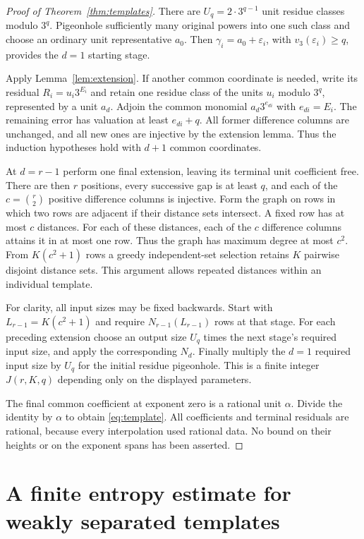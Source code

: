 \documentclass[11pt]{article}
\theoremstyle{definition}
\theoremstyle{remark}
\newcommand{\val}{v_3}
\begin{document}
\begin{proof}[Proof of Theorem~\ref{thm:templates}]
There are $U_q=2\cdot3^{q-1}$ unit residue classes modulo $3^q$.
Pigeonhole sufficiently many original powers into one such class and
choose an ordinary unit representative $a_0$. Then
$\gamma_i=a_0+\varepsilon_i$, with $\val(\varepsilon_i)\ge q$,
provides the $d=1$ starting stage.

Apply Lemma~\ref{lem:extension}. If another common coordinate is
needed, write its residual $R_i=u_i3^{E_i}$ and retain one residue
class of the units $u_i$ modulo $3^q$, represented by a unit $a_d$.
Adjoin the common monomial $a_d3^{e_{di}}$ with $e_{di}=E_i$.
The remaining error has valuation at least $e_{di}+q$.
All former difference columns are unchanged, and all new ones are
injective by the extension lemma. Thus the induction hypotheses hold
with $d+1$ common coordinates.

At $d=r-1$ perform one final extension, leaving its terminal unit
coefficient free. There are then $r$ positions, every successive gap
is at least $q$, and each of the $c=\binom r2$ positive difference
columns is injective. Form the graph on rows in which two rows are
adjacent if their distance sets intersect. A fixed row has at most
$c$ distances. For each of these distances, each of the $c$ difference
columns attains it in at most one row. Thus the graph has maximum
degree at most $c^2$. From $K(c^2+1)$ rows a greedy independent-set
selection retains $K$ pairwise disjoint distance sets. This argument
allows repeated distances within an individual template.

For clarity, all input sizes may be fixed backwards. Start with
$L_{r-1}=K(c^2+1)$ and require $N_{r-1}(L_{r-1})$ rows at that stage.
For each preceding extension choose an output size $U_q$ times the
next stage's required input size, and apply the corresponding $N_d$.
Finally multiply the $d=1$ required input size by $U_q$ for the initial
residue pigeonhole. This is a finite integer $J(r,K,q)$ depending only
on the displayed parameters.

The final common coefficient at exponent zero is a rational unit
$\alpha$. Divide the identity by $\alpha$ to obtain
\eqref{eq:template}. All coefficients and terminal residuals are
rational, because every interpolation used rational data. No bound on
their heights or on the exponent spans has been asserted.
\end{proof}

\section{A finite entropy estimate for weakly separated templates}
\label{sec:entropy}
\end{document}
